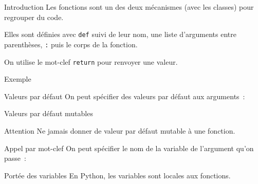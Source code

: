 \begin{frame}{Introduction}
  Les fonctions sont un des deux mécanismes (avec les classes) pour regrouper du code.

  Elles sont définies avec \texttt{def} suivi de leur nom, une liste d'arguments entre parenthèses, \texttt{:} puis le corps de la fonction.

  On utilise le mot-clef \texttt{return} pour renvoyer une valeur.
\end{frame}

\begin{frame}{Exemple}
\end{frame}

\begin{frame}{Valeurs par défaut}
  On peut spécifier des valeurs par défaut aux arguments~:

\end{frame}

\begin{frame}{Valeurs par défaut mutables}
  \begin{alertblock}{Attention}
    Ne jamais donner de valeur par défaut mutable à une fonction.
  \end{alertblock}

\end{frame}

\begin{frame}{Appel par mot-clef}
  On peut spécifier le nom de la variable de l'argument qu'on passe~:

\end{frame}

\begin{frame}{Portée des variables}
  En Python, les variables sont locales aux fonctions.

\end{frame}

